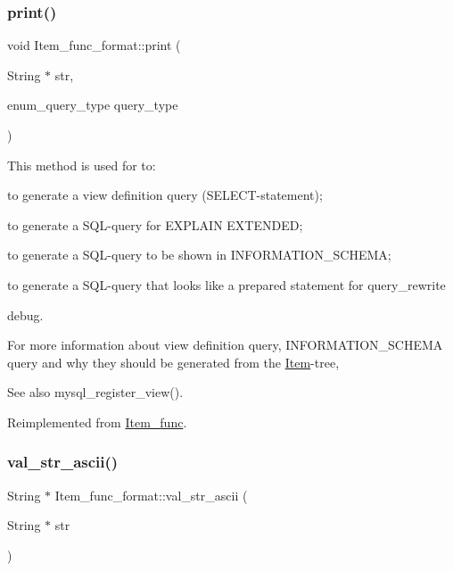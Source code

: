 \subsubsection{\texorpdfstring{print()}{print()}}
{\footnotesize\ttfamily void Item\+\_\+func\+\_\+format\+::print (\begin{DoxyParamCaption}\item[{String $\ast$}]{str,  }\item[{enum\+\_\+query\+\_\+type}]{query\+\_\+type }\end{DoxyParamCaption})\hspace{0.3cm}{\ttfamily [virtual]}}

This method is used for to\+:
\begin{DoxyItemize}
\item to generate a view definition query (S\+E\+L\+E\+CT-\/statement);
\item to generate a S\+QL-\/query for E\+X\+P\+L\+A\+IN E\+X\+T\+E\+N\+D\+ED;
\item to generate a S\+QL-\/query to be shown in I\+N\+F\+O\+R\+M\+A\+T\+I\+O\+N\+\_\+\+S\+C\+H\+E\+MA;
\item to generate a S\+QL-\/query that looks like a prepared statement for query\+\_\+rewrite
\item debug.
\end{DoxyItemize}

For more information about view definition query, I\+N\+F\+O\+R\+M\+A\+T\+I\+O\+N\+\_\+\+S\+C\+H\+E\+MA query and why they should be generated from the \mbox{\hyperlink{classItem}{Item}}-\/tree, \begin{DoxySeeAlso}{See also}
mysql\+\_\+register\+\_\+view(). 
\end{DoxySeeAlso}


Reimplemented from \mbox{\hyperlink{classItem__func_afb302ee25d4721ace27d3f5053d4ee41}{Item\+\_\+func}}.

\mbox{\label{classItem__func__format_a9f01cf724eacb711a5874955671fdc67}} 
\subsubsection{\texorpdfstring{val\+\_\+str\+\_\+ascii()}{val\_str\_ascii()}}
{\footnotesize\ttfamily String $\ast$ Item\+\_\+func\+\_\+format\+::val\+\_\+str\+\_\+ascii (\begin{DoxyParamCaption}\item[{String $\ast$}]{str }\end{DoxyParamCaption})\hspace{0.3cm}{\ttfamily [virtual]}}

